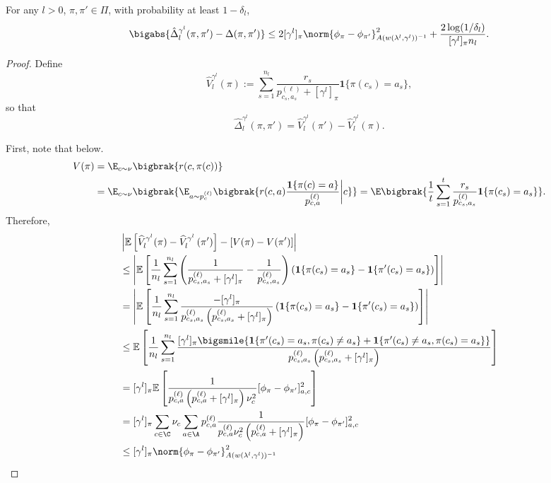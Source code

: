 \documentclass{article}
\newcommand{\1}{\mathbf{1}}
\begin{document}
\begin{lemma}\label{lem:EE}
For any $l>0$, $\pi,\pi'\in\Pi$, with probability at least $1-\delta_l$, 
\[\bigabs{\hat{\Delta}_{l}^{\gamma^l}(\pi,\pi')-\Delta(\pi,\pi')} \leq 2[\gamma^l]_\pi \norm{\phi_\pi-\phi_{\pi'}}_{A(w(\lambda^{l},\gamma^l))^{-1}}^2+\frac{2\log (1 / \delta_l)}{[\gamma^l]_\pi n_l}.\]
\end{lemma}
\begin{proof}
Define \[\hat{V}_l^{\gamma^l}(\pi) := \sum_{s=1}^{n_l}\frac{r_s}{p^{(\ell)}_{c_s,a_s}+[\gamma^l]_\pi}\1\{\pi(c_s)=a_s\},\] so that \[\hat{\Delta}_l^{\gamma^l}(\pi,\pi')=\hat{V}_l^{\gamma^l}(\pi')-\hat{V}_l^{\gamma^l}(\pi).\]

First, note that below.
\begin{align*}
    V(\pi) &= \E_{c\sim \nu}\bigbrak{r(c,\pi(c))}\\
    &= \E_{c\sim\nu}\bigbrak{\E_{a\sim p^{(\ell)}_c}\bigbrak{r(c,a)\frac{\1\{\pi(c)=a\}}{p^{(\ell)}_{c,a}}\bigg|c}}= \E\bigbrak{\frac{1}{t}\sum_{s=1}^t\frac{r_s}{p^{(\ell)}_{c_s,a_s}}\1\{\pi(c_s)=a_s\}}.
\end{align*}
Therefore, 
\begin{align*}
&\left|\mathbb{E}\left[\widehat{V}_l^{\gamma^l}(\pi)-\widehat{V}^{\gamma^l}_l\left(\pi^{\prime}\right)\right]-\left[V(\pi)-V(\pi')\right]\right|\\ &\leq\left|\mathbb{E}\left[\frac{1}{n_l} \sum_{s=1}^{n_l}\left(\frac{1}{p^{(\ell)}_{c_s,a_s}+[\gamma^l]_\pi}-\frac{1}{p^{(\ell)}_{c_s,a_s}}\right)\left(\1\{\pi(c_s)=a_s\}-\1\{\pi'(c_s)=a_s\}\right)\right]\right| \\
&=\left|\mathbb{E}\left[\frac{1}{n_l} \sum_{s=1}^{n_l} \frac{-[\gamma^l]_\pi}{p^{(\ell)}_{c_s,a_s}\left(p^{(\ell)}_{c_s,a_s}+[\gamma^l]_\pi\right)}\left(\1\{\pi(c_s)=a_s\}-\1\{\pi'(c_s)=a_s\}\right)\right]\right| \\
& \leq \mathbb{E}\left[\frac{1}{n_l} \sum_{s=1}^{n_l} \frac{[\gamma^l]_\pi\bigsmile{\1\{\pi'(c_s)=a_s,\pi(c_s)\ne a_s\}+\1\{\pi'(c_s)\ne a_s,\pi(c_s)=a_s\}}}{p^{(\ell)}_{c_s,a_s}\left(p^{(\ell)}_{c_s,a_s}+[\gamma^l]_\pi\right)}\right] \\
&=[\gamma^l]_\pi \mathbb{E}\left[\frac{1}{p^{(\ell)}_{c,a}\left(p^{(\ell)}_{c,a}+[\gamma^l]_\pi\right)\nu_c^2}[\phi_\pi-\phi_{\pi'}]_{a,c}^2\right] \\
&=[\gamma^l]_\pi \sum_{c\in\C}\nu_c\sum_{a\in\A}p^{(\ell)}_{c,a} \frac{1}{p^{(\ell)}_{c,a}\nu_c^2\left(p^{(\ell)}_{c,a}+[\gamma^l]_\pi\right)}[\phi_\pi-\phi_{\pi'}]_{a,c}^2 \\
& \leq [\gamma^l]_\pi \norm{\phi_\pi-\phi_{\pi'}}_{A(w(\lambda^{l},\gamma^l))^{-1}}^2

\end{align*}
\end{proof}
\end{document}
